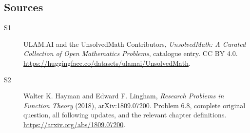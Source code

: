 \documentclass[11pt]{book}
\begin{document}
\subsection{Sources}
\begin{description}
\item[\hypertarget{source:statement:1}{S1}] ULAM.AI and the UnsolvedMath Contributors, \emph{UnsolvedMath: A Curated Collection of Open Mathematics Problems}, catalogue entry. CC BY 4.0. \url{https://huggingface.co/datasets/ulamai/UnsolvedMath}.
\item[\hypertarget{source:statement:2}{S2}] Walter K. Hayman and Edward F. Lingham, \emph{Research Problems in Function Theory} (2018), arXiv:1809.07200. Problem 6.8, complete original question, all following updates, and the relevant chapter definitions. \url{https://arxiv.org/abs/1809.07200}.
\end{description}
\label{end:statement}
\end{document}
